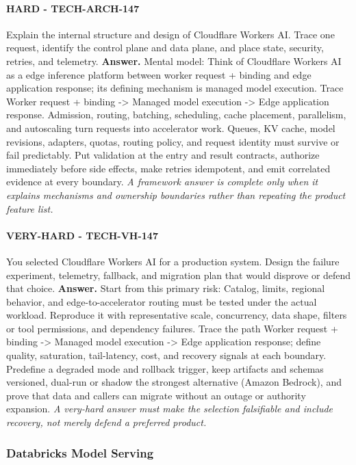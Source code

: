 \paragraph{HARD - TECH-ARCH-147} Explain the internal structure and design of Cloudflare Workers AI. Trace one request, identify the control plane and data plane, and place state, security, retries, and telemetry.
\textbf{Answer.} Mental model: Think of Cloudflare Workers AI as a edge inference platform between worker request + binding and edge application response; its defining mechanism is managed model execution. Trace Worker request + binding -> Managed model execution -> Edge application response. Admission, routing, batching, scheduling, cache placement, parallelism, and autoscaling turn requests into accelerator work. Queues, KV cache, model revisions, adapters, quotas, routing policy, and request identity must survive or fail predictably. Put validation at the entry and result contracts, authorize immediately before side effects, make retries idempotent, and emit correlated evidence at every boundary.
\textit{A framework answer is complete only when it explains mechanisms and ownership boundaries rather than repeating the product feature list.}
\paragraph{VERY-HARD - TECH-VH-147} You selected Cloudflare Workers AI for a production system. Design the failure experiment, telemetry, fallback, and migration plan that would disprove or defend that choice.
\textbf{Answer.} Start from this primary risk: Catalog, limits, regional behavior, and edge-to-accelerator routing must be tested under the actual workload. Reproduce it with representative scale, concurrency, data shape, filters or tool permissions, and dependency failures. Trace the path Worker request + binding -> Managed model execution -> Edge application response; define quality, saturation, tail-latency, cost, and recovery signals at each boundary. Predefine a degraded mode and rollback trigger, keep artifacts and schemas versioned, dual-run or shadow the strongest alternative (Amazon Bedrock), and prove that data and callers can migrate without an outage or authority expansion.
\textit{A very-hard answer must make the selection falsifiable and include recovery, not merely defend a preferred product.}
\subsubsection*{Databricks Model Serving}
